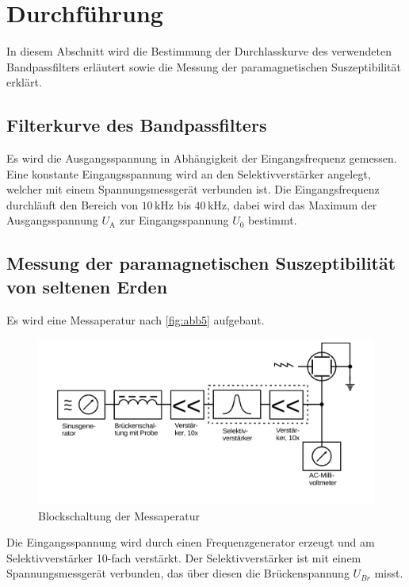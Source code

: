 \section{Durchführung}
\label{sec:Durchführung}

In diesem Abschnitt wird die Bestimmung der Durchlasskurve des verwendeten Bandpassfilters erläutert sowie die Messung der paramagnetischen Suszeptibilität erklärt.

\subsection{Filterkurve des Bandpassfilters}

Es wird die Ausgangsspannung in Abhängigkeit der Eingangsfrequenz gemessen. 
Eine konstante Eingangsspannung wird an den Selektivverstärker angelegt, welcher mit einem Spannungsmessgerät verbunden ist. 
Die Eingangsfrequenz durchläuft den Bereich von $ 10 \, \unit{\kilo\hertz}$ bis $40 \, \unit{\kilo\hertz}$, dabei wird das Maximum der Ausgangsspannung $ U_\text{A} $ zur Eingangsspannung $U_0$ bestimmt.


\subsection{Messung der paramagnetischen Suszeptibilität von seltenen Erden}

Es wird eine Messaperatur nach \autoref{fig:abb5} aufgebaut.

\begin{figure}[H]
    \centering
    \includegraphics{figures/Abb_5.pdf}
    \caption{Blockschaltung der Messaperatur}
    \label{fig:abb5}
\end{figure} 

Die Eingangsspannung wird durch einen Frequenzgenerator erzeugt und am Selektivverstärker 10-fach verstärkt.
Der Selektivverstärker ist mit einem Spannungsmessgerät verbunden, das über diesen die Brückenspannung $ U_{Br}$ misst.\\

